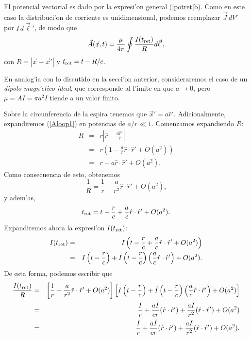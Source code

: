 El potencial vectorial es dado por la expresi'on general (\ref{potret}b). Como en este caso la distribuci'on de corriente es unidimensional, podemos reemplazar $\vec{J}\,dV'$ por $I\,d\vec{\ell} '$, de modo que
\begin{equation}
 \vec{A}(\vec{x},t)=\frac{\mu}{4\pi}\oint \frac{I(t_{\rm ret})}{R}d\vec{\ell} ' , \label{Aloop1}
\end{equation}
con $R=|\vec{x}-\vec{x}'|$ y $t_{\rm ret}=t-R/c$.

En analog'ia con lo discutido en la secci'on anterior, consideraremos el caso de un \textit{dipolo magn'etico ideal}, que corresponde al l'imite en que $a\to 0$, pero $\mu=AI=\pi a^2I$ tiende a un valor finito.

Sobre la circunferencia de la espira tenemos que $\vec{x}'=a\hat{r}'$. Adicionalmente, expandiremos (\ref{Aloop1}) en potencias de $a/r\ll 1$.  Comenzamos expandiendo $R$:
\begin{eqnarray}
 R&=&r\left|\hat{r}-\frac{a\hat{r}'}{r}\right| \\
&=&r\left(1-\frac{a}{r}\hat{r}\cdot\hat{r}'+O(a^2)\right) \\
&=& r-a\hat{r}\cdot\hat{r}'+O(a^2).
\end{eqnarray}
Como consecuencia de esto, obtenemos
\begin{equation}
 \frac{1}{R}=\frac{1}{r}+\frac{a}{r^2}\hat{r}\cdot\hat{r}'+O(a^2),
\end{equation}
y adem'as,
\begin{equation}
 t_{\rm ret}=t-\frac{r}{c}+\frac{a}{c}\hat{r}\cdot\hat{r}'+O(a^2).
\end{equation}
Expandiremos ahora la expresi'on $I(t_{\rm ret})$:
\begin{eqnarray}
 I(t_{\rm ret})
&=&I\left(t-\frac{r}{c}+\frac{a}{c}\hat{r}\cdot\hat{r}'+O(a^2)\right) \\
&=&I\left(t-\frac{r}{c}\right)+\dot{I}\left(t-\frac{r}{c}\right)\left(\frac{a}{c}\hat{r}\cdot\hat{r}'\right)+O(a^2).
\end{eqnarray}
De esta forma, podemos escribir que
\begin{eqnarray}
\frac{I(t_{\rm ret})}{R}
&=&\left[\frac{1}{r}+\frac{a}{r^2}\hat{r}\cdot\hat{r}'+O(a^2)\right]\left[I\left(t-\frac{r}{c}\right)+\dot{I}\left(t-\frac{r}{c}\right)\left(\frac{a}{c}\hat{r}\cdot\hat{r}'\right)+O(a^2)\right]\\
&=&\frac{I}{r}+\frac{a\dot{I}}{cr}(\hat{r}\cdot\hat{r}')+\frac{aI}{r^2}(\hat{r}\cdot\hat{r}')
+O(a^2)\\
&=&\frac{I}{r}+\frac{a\dot{I}}{cr}(\hat{r}\cdot\hat{r}')+\frac{aI}{r^2}(\hat{r}\cdot\hat{r}')+O(a^2).
\end{eqnarray}
